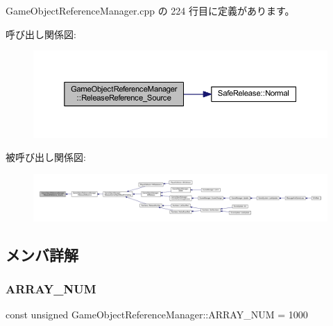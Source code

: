  Game\+Object\+Reference\+Manager.\+cpp の 224 行目に定義があります。

呼び出し関係図\+:\nopagebreak
\begin{figure}[H]
\begin{center}
\leavevmode
\includegraphics[width=350pt]{class_game_object_reference_manager_afe2c3af4a929f25c87ac2253d9b763f7_cgraph}
\end{center}
\end{figure}
被呼び出し関係図\+:
\nopagebreak
\begin{figure}[H]
\begin{center}
\leavevmode
\includegraphics[width=350pt]{class_game_object_reference_manager_afe2c3af4a929f25c87ac2253d9b763f7_icgraph}
\end{center}
\end{figure}


\subsection{メンバ詳解}
\mbox{\label{class_game_object_reference_manager_a962d30b10c5b76353645773b2c1740ce}} 
\subsubsection{\texorpdfstring{A\+R\+R\+A\+Y\+\_\+\+N\+UM}{ARRAY\_NUM}}
{\footnotesize\ttfamily const unsigned Game\+Object\+Reference\+Manager\+::\+A\+R\+R\+A\+Y\+\_\+\+N\+UM = 1000\hspace{0.3cm}{\ttfamily [static]}}



